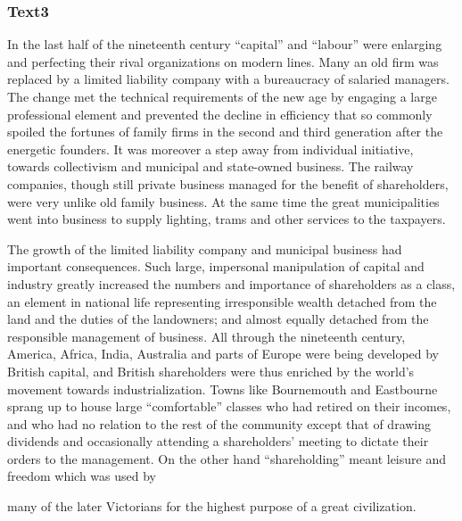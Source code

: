 \documentclass[a4paper]{article}
\begin{document}
\subsubsection{Text3}

\par
In the last half of the nineteenth century “capital” and “labour” were enlarging and perfecting their rival organizations on modern lines. Many an old firm was replaced by a limited liability company with a bureaucracy of salaried managers. The change met the technical requirements of the new age by engaging a large professional element and prevented the decline in efficiency that so commonly spoiled the fortunes of family firms in the second and third generation after the energetic founders. It was moreover a step away from individual initiative, towards collectivism and municipal and state-owned business. The railway companies, though still private business managed for the benefit of shareholders, were very unlike old family business. At the same time the great municipalities went into business to supply lighting, trams and other services to the taxpayers.

\par
The growth of the limited liability company and municipal business had important consequences. Such large, impersonal manipulation of capital and industry greatly increased the numbers and importance of shareholders as a class, an element in national life representing irresponsible wealth detached from the land and the duties of the landowners; and almost equally detached from the responsible management of business. All through the nineteenth century, America, Africa, India, Australia and parts of Europe were being developed by British capital, and British shareholders were thus enriched by the world’s movement towards industrialization. Towns like Bournemouth and Eastbourne sprang up to house large “comfortable” classes who had retired on their incomes, and who had no relation to the rest of the community except that of drawing dividends and occasionally attending a shareholders’ meeting to dictate their orders to the management. On the other hand “shareholding” meant leisure and freedom which was used by

\par
many of the later Victorians for the highest purpose of a great civilization.
\end{document}

